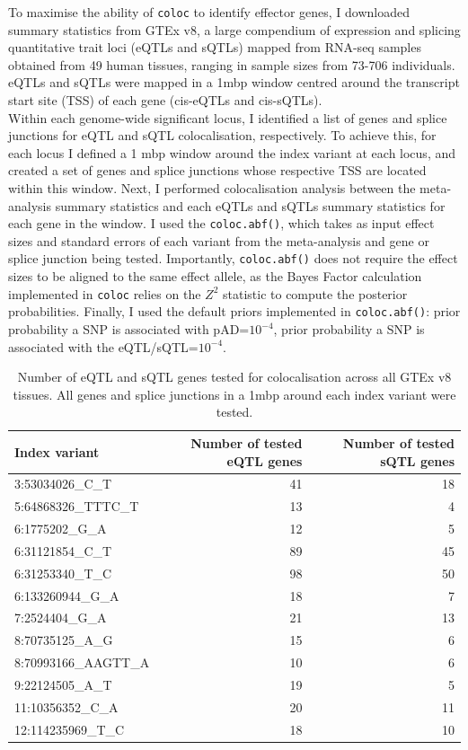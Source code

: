 To maximise the ability of \Verb+coloc+ to identify effector genes, I downloaded summary statistics from GTEx v8, a large compendium of expression and splicing quantitative trait loci (eQTLs and sQTLs) mapped from RNA-seq samples obtained from 49 human tissues, ranging in sample sizes from 73-706 individuals. eQTLs and sQTLs were mapped in a 1mbp window centred around the transcript start site (TSS) of each gene (cis-eQTLs and cis-sQTLs).\\

Within each genome-wide significant locus, I identified a list of genes and splice junctions for eQTL and sQTL colocalisation, respectively. To achieve this, for each locus I defined a 1 mbp window around the index variant at each locus, and created a set of genes and splice junctions whose respective TSS are located within this window. Next, I performed colocalisation analysis between the meta-analysis summary statistics and each eQTLs and sQTLs summary statistics for each gene in the window. I used the \Verb+coloc.abf()+, which takes as input effect sizes and standard errors of each variant from the meta-analysis and gene or splice junction being tested. Importantly, \Verb+coloc.abf()+ does not require the effect sizes to be aligned to the same effect allele, as the Bayes Factor calculation implemented in \Verb+coloc+ relies on the $Z^{2}$ statistic to compute the posterior probabilities. Finally, I used the default priors implemented in \Verb+coloc.abf()+: prior probability a SNP is associated with pAD=$10^{-4}$, prior probability a SNP is associated with the eQTL/sQTL=$10^{-4}$.

\begin{table}[H]

  \caption{Number of eQTL and sQTL genes tested for colocalisation across all GTEx v8 tissues. All genes and splice junctions in a 1mbp around each index variant were tested.}
  \centering
  \begin{tabular}[t]{|l|r|r|}
  \hline
  Index variant & Number of tested eQTL genes & Number of tested sQTL genes\\
  \hline
  3:53034026\_C\_T & 41 & 18\\
  \hline
  5:64868326\_TTTC\_T & 13 & 4\\
  \hline
  6:1775202\_G\_A & 12 & 5\\
  \hline
  6:31121854\_C\_T & 89 & 45\\
  \hline
  6:31253340\_T\_C & 98 & 50\\
  \hline
  6:133260944\_G\_A & 18 & 7\\
  \hline
  7:2524404\_G\_A & 21 & 13\\
  \hline
  8:70735125\_A\_G & 15 & 6\\
  \hline
  8:70993166\_AAGTT\_A & 10 & 6\\
  \hline
  9:22124505\_A\_T & 19 & 5\\
  \hline
  11:10356352\_C\_A & 20 & 11\\
  \hline
  12:114235969\_T\_C & 18 & 10\\
  \hline
  \end{tabular}
  \end{table}



